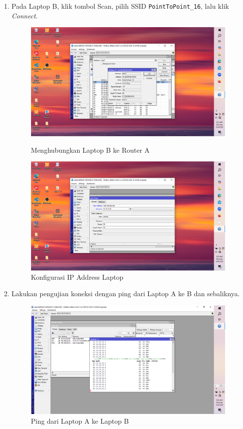 \begin{enumerate}
    \item Pada Laptop B, klik tombol Scan, pilih SSID \texttt{PointToPoint\_16}, lalu klik \textit{Connect}.
    \begin{figure}[H]
        \centering
        \includegraphics[width=0.5\linewidth]{gambar3.png}
        \caption{Menghubungkan Laptop B ke Router A}
        \label{fig:hubungkan-laptop}
        \includegraphics[width=0.5\linewidth]{gambar5.png}
        \caption{Konfigurasi IP Address Laptop}
        \label{fig:ip-laptop}
    \end{figure}

    \item Lakukan pengujian koneksi dengan ping dari Laptop A ke B dan sebaliknya.
    \begin{figure}[H]
        \centering
        \includegraphics[width=0.5\linewidth]{ping1.png}
        \caption{Ping dari Laptop A ke Laptop B}
        \label{fig:ping-ptp}
    \end{figure}
\end{enumerate}


